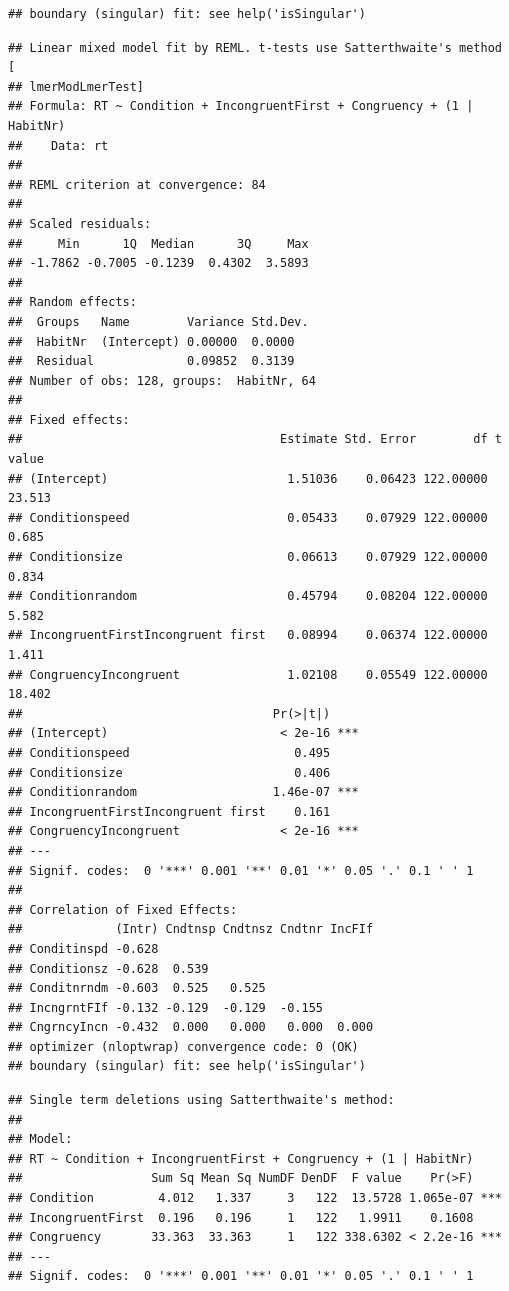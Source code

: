 \documentclass[
]{book}
\begin{document}
\begin{verbatim}
## boundary (singular) fit: see help('isSingular')
\end{verbatim}

\begin{verbatim}
## Linear mixed model fit by REML. t-tests use Satterthwaite's method [
## lmerModLmerTest]
## Formula: RT ~ Condition + IncongruentFirst + Congruency + (1 | HabitNr)
##    Data: rt
## 
## REML criterion at convergence: 84
## 
## Scaled residuals: 
##     Min      1Q  Median      3Q     Max 
## -1.7862 -0.7005 -0.1239  0.4302  3.5893 
## 
## Random effects:
##  Groups   Name        Variance Std.Dev.
##  HabitNr  (Intercept) 0.00000  0.0000  
##  Residual             0.09852  0.3139  
## Number of obs: 128, groups:  HabitNr, 64
## 
## Fixed effects:
##                                    Estimate Std. Error        df t value
## (Intercept)                         1.51036    0.06423 122.00000  23.513
## Conditionspeed                      0.05433    0.07929 122.00000   0.685
## Conditionsize                       0.06613    0.07929 122.00000   0.834
## Conditionrandom                     0.45794    0.08204 122.00000   5.582
## IncongruentFirstIncongruent first   0.08994    0.06374 122.00000   1.411
## CongruencyIncongruent               1.02108    0.05549 122.00000  18.402
##                                   Pr(>|t|)    
## (Intercept)                        < 2e-16 ***
## Conditionspeed                       0.495    
## Conditionsize                        0.406    
## Conditionrandom                   1.46e-07 ***
## IncongruentFirstIncongruent first    0.161    
## CongruencyIncongruent              < 2e-16 ***
## ---
## Signif. codes:  0 '***' 0.001 '**' 0.01 '*' 0.05 '.' 0.1 ' ' 1
## 
## Correlation of Fixed Effects:
##             (Intr) Cndtnsp Cndtnsz Cndtnr IncFIf
## Conditinspd -0.628                              
## Conditionsz -0.628  0.539                       
## Conditnrndm -0.603  0.525   0.525               
## IncngrntFIf -0.132 -0.129  -0.129  -0.155       
## CngrncyIncn -0.432  0.000   0.000   0.000  0.000
## optimizer (nloptwrap) convergence code: 0 (OK)
## boundary (singular) fit: see help('isSingular')
\end{verbatim}

\begin{verbatim}
## Single term deletions using Satterthwaite's method:
## 
## Model:
## RT ~ Condition + IncongruentFirst + Congruency + (1 | HabitNr)
##                  Sum Sq Mean Sq NumDF DenDF  F value    Pr(>F)    
## Condition         4.012   1.337     3   122  13.5728 1.065e-07 ***
## IncongruentFirst  0.196   0.196     1   122   1.9911    0.1608    
## Congruency       33.363  33.363     1   122 338.6302 < 2.2e-16 ***
## ---
## Signif. codes:  0 '***' 0.001 '**' 0.01 '*' 0.05 '.' 0.1 ' ' 1
\end{verbatim}
\end{document}
